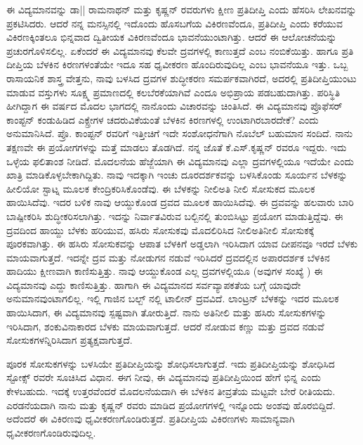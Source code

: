 ಈ ವಿದ್ಯಮಾನವನ್ನು ಡಾ|| ರಾಮನಾಥನ್ ಮತ್ತು ಕೃಷ್ಣನ್ ರವರುಗಳು ಕ್ಷೀಣ ಪ್ರತಿದೀಪ್ತಿ ಎಂದು ಹೆಸರಿಸಿ ಲೇಖನವನ್ನು ಪ್ರಕಟಿಸಿದರು. ಆದರೆ ನನ್ನ ಮನಸ್ಸಿನಲ್ಲಿ ಇದೊಂದು ಹೊಸಬಗೆಯ ವಿಕಿರಣವೆಂದೂ, ಪ್ರತಿದೀಪ್ತಿ ಎಂದು ಕರೆಯುವ ವಿಕಿರಣಕ್ಕಿಂತಲೂ ಭಿನ್ನವಾದ ದ್ವಿತೀಯಕ ವಿಕಿರಣವೆಂದೂ ಭಾವನೆಯುಂಟಾಗಿತ್ತು. ಆದರೆ ಈ ಆಲೋಚನೆಯನ್ನು ಪ್ರಚುರಗೊಳಿಸಲಿಲ್ಲ. ಏಕೆಂದರೆ ಈ ವಿದ್ಯಮಾನವು ಕೆಲವೇ ದ್ರವಗಳಲ್ಲಿ ಕಾಣುತ್ತದೆ ಎಂಬ ನಂಬಿಕೆಯಿತ್ತು. ಹಾಗೂ ಪ್ರತಿ ದೀಪ್ತಿಯ ಬೆಳಕಿನ ಕಿರಣಗಳಂತೆಯೇ ಇದೂ ಸಹ ಧೃವೀಕರಣ ಹೊಂದಿರುವುದಿಲ್ಲ ಎಂಬ ಭಾವನೆಯೂ ಇತ್ತು. ಒಬ್ಬ ರಾಸಾಯನಿಕ ಶಾಸ್ತ್ರ ವೇತ್ತನು, ನಾವು ಬಳಸಿದ ದ್ರವಗಳ ಶುದ್ಧೀಕರಣ ಸಮರ್ಪಕವಾಗಿರದೆ, ಅದರಲ್ಲಿ ಪ್ರತಿದೀಪ್ತಿಯುಂಟು ಮಾಡುವ ವಸ್ತುಗಳು ಸೂಕ್ಷ್ಮ ಪ್ರಮಾಣದಲ್ಲಿ ಕಲಬೆರಕೆಯಾಗಿವೆ ಎಂದೂ ಅಭಿಪ್ರಾಯ ಪಡಬಹುದಾಗಿತ್ತು. ಪರಿಸ್ಥಿತಿ ಹೀಗಿದ್ದಾಗ ಈ ವರ್ಷದ ಮೊದಲ ಭಾಗದಲ್ಲಿ ನಾನೊಂದು ವಿಚಾರವನ್ನು ಚಿಂತಿಸಿದೆ. ಈ ವಿದ್ಯಮಾನವು ಪ್ರೊಫೆಸರ್ ಕಾಂಪ್ಟನ್ ಕಂಡುಹಿಡಿದ ಎಕ್ಸ್\enginline{-}ರೇಗಳ ಚದರುವಿಕೆಯಂತೆ ಬೆಳಕಿನ ಕಿರಣಗಳಲ್ಲಿ ಉಂಟಾಗಿರಬಾರದೇಕೆ? ಎಂದು ಅನುಮಾನಿಸಿದೆ. ಪ್ರೊ. ಕಾಂಪ್ಟನ್ ರವರಿಗೆ ಇತ್ತೀಚಿಗೆ ಇದೇ ಸಂಶೋಧನೆಗಾಗಿ ನೊಬೆಲ್ ಬಹುಮಾನ ಸಂದಿದೆ. ನಾನು ತಕ್ಷಣವೇ ಈ ಪ್ರಯೋಗಗಳನ್ನು ಮತ್ತೆ ಮಾಡಲು ತೊಡಗಿದೆ. ನನ್ನ ಜೊತೆ ಕೆ.ಎಸ್.ಕೃಷ್ಣನ್ ರವರೂ ಇದ್ದರು. ಇದು ಒಳ್ಳೆಯ ಫಲಿತಾಂಶ ನೀಡಿದೆ. ಮೊದಲನೆಯ ಹೆಜ್ಜೆಯಾಗಿ ಈ ವಿದ್ಯಮಾನವು ಎಲ್ಲಾ ದ್ರವಗಳಲ್ಲಿಯೂ ಇದೆಯೇ ಎಂದು ಖಾತ್ರಿ ಮಾಡಿಕೊಳ್ಳಬೇಕಾಗಿದ್ದಿತು. ನಾವು ಇದಕ್ಕಾಗಿ  ಇಂಚು ದೂರದರ್ಶಕವನ್ನು ಬಳಸಿಕೊಂಡು ಸೂರ್ಯನ ಬೆಳಕನ್ನು ಹೀಲಿಯೋ ಸ್ಟಾಟ್ನ ಮೂಲಕ ಕೇಂದ್ರಿಕರಿಸಿಕೊಂಡೆವು. ಈ ಬೆಳಕನ್ನು ನೀಲಿ\enginline{-}ಅತಿ ನೀಲಿ ಸೋಸುಕದ ಮೂಲಕ ಹಾಯಿಸಿದೆವು. ಇದರ ಬಳಿಕ ನಾವು ಆಯ್ದುಕೊಂಡ ದ್ರವದ ಮೂಲಕ ಹಾಯಿಸಿದೆವು. ಈ ದ್ರವವನ್ನು ಹಲವಾರು ಬಾರಿ ಬಾಷ್ಪೀಕರಿಸಿ ಶುದ್ಧೀಕರಿಸಲಾಗಿತ್ತು. ಇದನ್ನು ನಿರ್ವಾತವಿರುವ ಬಲ್ಬಿನಲ್ಲಿ ತುಂಬಿಸಿಟ್ಟು ಪ್ರಯೋಗ ಮಾಡುತ್ತಿದ್ದೆವು. ಈ ದ್ರವದಿಂದ ಹಾಯ್ದು ಬೆಳಕು ಹರಿಯುವ, ಹಸಿರು ಸೋಸುಕವು ಮೊದಲಿರಿಸಿದ ನೀಲಿ\enginline{-}ಅತಿನೀಲಿ ಸೋಸುಕಕ್ಕೆ ಪೂರಕವಾಗಿತ್ತು. ಈ ಹಸಿರು ಸೋಸುಕವನ್ನು ಆಪಾತ ಬೆಳಕಿಗೆ ಅಡ್ಡಲಾಗಿ ಇರಿಸಿದಾಗ ಯಾವ ದೀಪನವೂ ಇರದೆ ಬೆಳಕು ಮಾಯವಾಗುತ್ತದೆ. ಇದನ್ನೇ ದ್ರವ ಮತ್ತು ನೋಡುಗನ ನಡುವೆ ಇರಿಸಿದರೆ ದ್ರವದಲ್ಲಿನ ಅಪಾರದರ್ಶಕ ಬೆಳಕಿನ ಹಾದಿಯು ಕ್ಷೀಣವಾಗಿ ಕಾಣಿಸುತ್ತಿತ್ತು. ನಾವು ಆಯ್ದುಕೊಂಡ ಎಲ್ಲ ದ್ರವಗಳಲ್ಲಿಯೂ (ಅವುಗಳ ಸಂಖ್ಯೆ ) ಈ ವಿದ್ಯಮಾನವು ಎದ್ದು ಕಾಣಿಸುತ್ತಿತ್ತು. ಹಾಗಾಗಿ ಈ ವಿದ್ಯಮಾನದ ಸರ್ವವ್ಯಾಪಕತೆಯ ಬಗ್ಗೆ ಯಾವುದೇ ಅನುಮಾನವುಂಟಾಗಲಿಲ್ಲ. ಇಲ್ಲಿ ಗಾಜಿನ ಬಲ್ಬ್ ನಲ್ಲಿ ಟಾಲೀನ್ ದ್ರವವಿದೆ. ಲಾಂಟ್ರನ್ ಬೆಳಕನ್ನು ಇದರ ಮೂಲಕ ಹಾಯಿಸಿದಾಗ, ಈ ವಿದ್ಯಮಾನವು ಸ್ಪಷ್ಟವಾಗಿ ತೋರುತ್ತಿದೆ. ನಾನು ಅತಿನೀಲಿ ಮತ್ತು ಹಸಿರು ಸೋಸುಕಗಳನ್ನು ಇರಿಸಿದಾಗ, ಶಂಕುವಿನಾಕಾರದ ಬೆಳಕು ಮಾಯವಾಗುತ್ತದೆ. ಆದರೆ ನೋಡುವ ಕಣ್ಣು ಮತ್ತು ದ್ರವದ ನಡುವೆ ಸೋಸುಕಗಳನ್ನಿರಿಸಿದಾಗ ಪ್ರತ್ಯಕ್ಷವಾಗುತ್ತದೆ.

ಪೂರಕ ಸೋಸುಕಗಳನ್ನು ಬಳಸಿಯೇ ಪ್ರತಿದೀಪ್ತಿಯನ್ನು ಶೋಧಿಸಲಾಗುತ್ತದೆ. ಇದು ಪ್ರತಿದೀಪ್ತಿಯನ್ನು ಶೋಧಿಸಿದ ಸ್ಟೋಕ್ಸ್ ರವರೇ ಸೂಚಿಸಿದ ವಿಧಾನ. ಈಗ ನೀವು, ಈ ವಿದ್ಯಮಾನವು ಪ್ರತಿದೀಪ್ತಿಯಿಂದ ಹೇಗೆ ಭಿನ್ನ ಎಂದು ಕೇಳಬಹುದು. ಇದಕ್ಕೆ ಉತ್ತರವೆಂದರೆ\enginline{-} ಮೊದಲನೆಯದಾಗಿ ಈ ಬೆಳಕಿನ ತೀವ್ರತೆಯ ಮಟ್ಟವೇ ಬೇರೆ ರೀತಿಯದು. ಎರಡನೆಯದಾಗಿ ನಾನು ಮತ್ತು ಕೃಷ್ಣನ್ ರವರು ಮಾಡಿದ ಪ್ರಯೋಗಗಳಲ್ಲಿ ಇನ್ನೊಂದು ಅಂಶವು ಹೊರಬಿದ್ದಿದೆ. ಅದೆಂದರೆ ಈ ವಿಕಿರಣವು ಧೃವೀಕರಣಗೊಂಡಿರುತ್ತದೆ. ಪ್ರತಿದೀಪ್ತಿಯ ವಿಕಿರಣಗಳು ಸಾಮಾನ್ಯವಾಗಿ ಧೃವೀಕರಣಗೊಂಡಿರುವುದಿಲ್ಲ.

